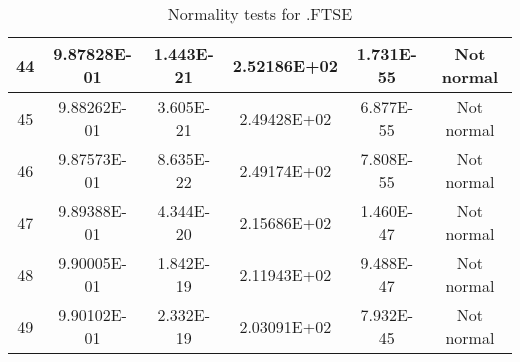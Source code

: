 \begin{table}[h]
\begin{tabular}{|c|c|c|c|c|c|}
		44 & 9.87828E-01 & 1.443E-21 & 2.52186E+02 & 1.731E-55 & Not normal\\\hline
		45 & 9.88262E-01 & 3.605E-21 & 2.49428E+02 & 6.877E-55 & Not normal\\\hline
		46 & 9.87573E-01 & 8.635E-22 & 2.49174E+02 & 7.808E-55 & Not normal\\\hline
		47 & 9.89388E-01 & 4.344E-20 & 2.15686E+02 & 1.460E-47 & Not normal\\\hline
		48 & 9.90005E-01 & 1.842E-19 & 2.11943E+02 & 9.488E-47 & Not normal\\\hline
		49 & 9.90102E-01 & 2.332E-19 & 2.03091E+02 & 7.932E-45 & Not normal\\\hline
	\end{tabular}
	\caption{Normality tests for .FTSE}
	\label{tab:normality_tests_FTSE}
\end{table}
